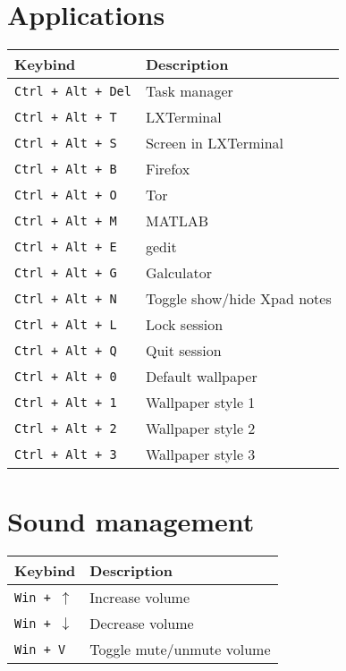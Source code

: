 \documentclass[letterpaper,12pt]{article}
\begin{document}
\section*{Applications}
\begin{table}[H]
  \begin{tabular}{|C{5cm}|L{10cm}|}
    \hline
    \textbf{Keybind} & \textbf{Description} \\
    \hline
    {\tt Ctrl + Alt + Del} & Task manager \\
    {\tt Ctrl + Alt + T} & LXTerminal \\
    {\tt Ctrl + Alt + S} & Screen in LXTerminal \\
    {\tt Ctrl + Alt + B} & Firefox \\
    {\tt Ctrl + Alt + O} & Tor \\
    {\tt Ctrl + Alt + M} & MATLAB \\
    {\tt Ctrl + Alt + E} & gedit \\
    {\tt Ctrl + Alt + G} & Galculator \\
    {\tt Ctrl + Alt + N} & Toggle show/hide Xpad notes \\
    {\tt Ctrl + Alt + L} & Lock session \\
    {\tt Ctrl + Alt + Q} & Quit session \\
    {\tt Ctrl + Alt + 0} & Default wallpaper \\
    {\tt Ctrl + Alt + 1} & Wallpaper style 1 \\
    {\tt Ctrl + Alt + 2} & Wallpaper style 2 \\
    {\tt Ctrl + Alt + 3} & Wallpaper style 3 \\
    \hline
  \end{tabular}
\end{table}

\section*{Sound management}
\begin{table}[H]
  \begin{tabular}{|C{5cm}|L{10cm}|}
    \hline
    \textbf{Keybind} & \textbf{Description} \\
    \hline
    {\tt Win + $\uparrow$} & Increase volume \\ 
    {\tt Win + $\downarrow$} & Decrease volume \\ 
    {\tt Win + V} & Toggle mute/unmute volume \\ 
    \hline
  \end{tabular}
\end{table}
\end{document}
